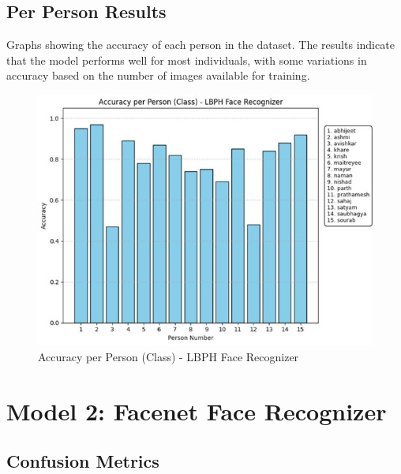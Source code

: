 \documentclass[openany]{report}
\begin{document}
\subsection{Per Person Results}
Graphs showing the accuracy of each person in the dataset. The results indicate that the model performs well for most individuals, with some variations in accuracy based on the number of images available for training.
\begin{figure}[H]
    \centering
    \includegraphics[width=.95\textwidth]{../imgs/model_1_per_person.jpg}
    \caption{Accuracy per Person (Class) - LBPH Face Recognizer}
\end{figure}

\section{Model 2: Facenet Face Recognizer}
\subsection{Confusion Metrics}
\end{document}
